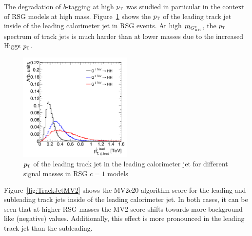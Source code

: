 The degradation of $b$-tagging at high $p_{\textrm{\footnotesize\sc t}}$ was studied in particular in the context of RSG models at high mass. Figure~\ref{fig:TrackJetPt} shows the $p_{\textrm{\footnotesize\sc t}}$ of the leading track jet inside of the leading calorimeter jet in RSG events. At high $m_{G^*_{\rm KK}}$, the $p_{\textrm{\footnotesize\sc t}}$ spectrum of track jets is much harder than at lower masses due to the increased Higgs $p_{\textrm{\footnotesize\sc t}}$. 

\begin{figure}[h!]
  \centering
  \captionsetup{justification=centering}

  \includegraphics[width=0.5\textwidth]{figures/TrackJetPt}
  \caption{$p_{\textrm{\footnotesize\sc t}}$ of the leading track jet in the leading calorimeter jet for different signal masses in RSG $c=1$ models}
  \label{fig:TrackJetPt}
\end{figure}

Figure~\ref{fig:TrackJetMV2} shows the MV2c20 algorithm score for the leading and subleading track jets inside of the leading calorimeter jet. In both cases, it can be seen that at higher RSG masses the MV2 score shifts towards more background like (negative) values. Additionally, this effect is more pronounced in the leading track jet than the subleading. 

